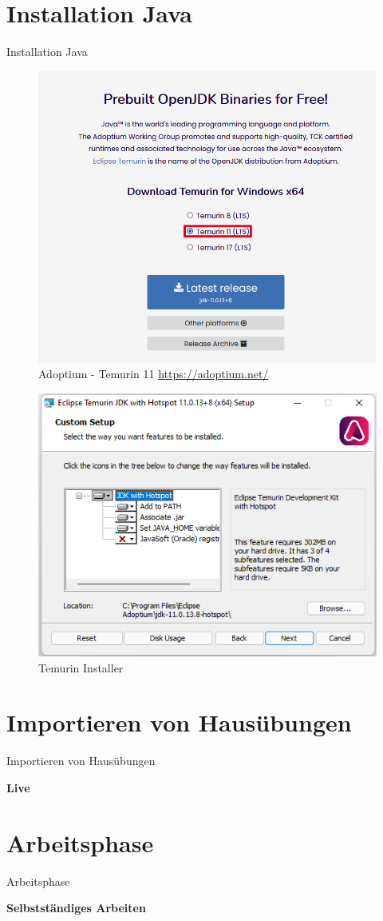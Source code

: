 \documentclass{../tuda-beamer}
\begin{document}
    \section{Installation Java}
    \begin{frame}{Installation Java}
        \begin{figure}[h]
            \centering
            \includegraphics[width=.35\linewidth]{graphics/temurin_11.png}
            \caption{Adoptium - Temurin 11 \url{https://adoptium.net/}}
        \end{figure}
    \end{frame}

    \begin{frame}[c]
        \begin{figure}[h]
            \centering
            \includegraphics[width=.3\linewidth]{graphics/temurin_installer.png}
            \caption{Temurin Installer}
        \end{figure}
    \end{frame}


    \section{Importieren von Hausübungen}
    \begin{frame}[c]{Importieren von Hausübungen}
        \begin{center}
            \textbf{\LARGE Live}
        \end{center}
    \end{frame}


    \section{Arbeitsphase}
    \begin{frame}[c]{Arbeitsphase}
        \begin{center}
            \textbf{\LARGE Selbstständiges Arbeiten}
        \end{center}
    \end{frame}
\end{document}
